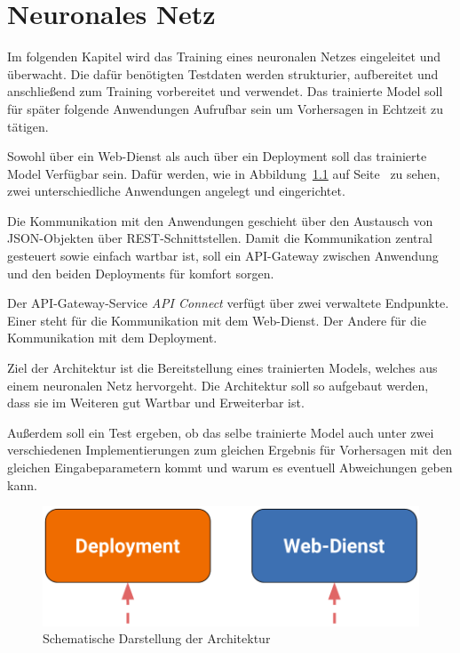 \chapter{Neuronales Netz}
\label{ch:neuronalesNetz}
Im folgenden Kapitel wird das Training eines neuronalen Netzes eingeleitet und überwacht. Die dafür benötigten Testdaten 
werden strukturier, aufbereitet und anschließend zum Training vorbereitet und verwendet. Das trainierte Model soll für später
folgende Anwendungen Aufrufbar sein um Vorhersagen in Echtzeit zu tätigen.

Sowohl über ein Web-Dienst als auch über ein Deployment soll das trainierte Model Verfügbar sein. Dafür werden, wie in 
Abbildung~\ref{fig:schematische_architektur} auf Seite~\pageref{fig:schematische_architektur} zu sehen, zwei unterschiedliche
Anwendungen angelegt und eingerichtet.

Die Kommunikation mit den Anwendungen geschieht über den Austausch von JSON-Objekten über REST-Schnittstellen. Damit die 
Kommunikation zentral gesteuert sowie einfach wartbar ist, soll ein API-Gateway zwischen Anwendung und den beiden Deployments
für komfort sorgen.  

Der API-Gateway-Service \textit{API Connect} verfügt über zwei verwaltete Endpunkte. Einer steht für die Kommunikation
mit dem Web-Dienst. Der Andere für die Kommunikation mit dem Deployment.

Ziel der Architektur ist die Bereitstellung eines trainierten Models, welches aus einem neuronalen Netz hervorgeht. Die 
Architektur soll so aufgebaut werden, dass sie im Weiteren gut Wartbar und Erweiterbar ist.

Außerdem soll ein Test ergeben, ob das selbe trainierte Model auch unter zwei verschiedenen Implementierungen zum gleichen 
Ergebnis für Vorhersagen mit den gleichen Eingabeparametern kommt und warum es eventuell Abweichungen geben kann.

\begin{figure}[h]
    \centering
    \includegraphics[scale=0.5]{images/kapitel_3/architektur_schematisch.pdf}
    \caption{Schematische Darstellung der Architektur}
    \label{fig:schematische_architektur}
\end{figure}